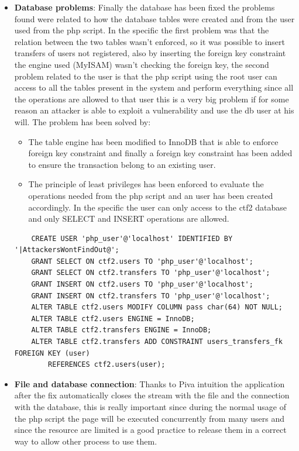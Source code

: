 \documentclass[14pt]{article}
\begin{document}
\begin{itemize}
	\item \textbf{Database problems}: Finally the database has been fixed the problems found were related to how the database tables were created and from the user used from the php script. In the specific the first problem was that the relation between the two tables wasn't enforced, so it was possible to insert transfers of users not registered, also by inserting the foreign key constraint the engine used (MyISAM) wasn't checking the foreign key, the second problem related to the user is that the php script using the root user can access to all the tables present in the system and perform everything since all the operations are allowed to that user this is a very big problem if for some reason an attacker is able to exploit a vulnerability and use the db user at his will.
	The problem has been solved by:
	\begin{itemize}
		\item The table engine has been modified to InnoDB that is able to enforce foreign key constraint and finally a foreign key constraint has been added to ensure the transaction belong to an existing user.
		
		\item The principle of least privileges has been enforced to evaluate the operations needed from the php script and an user has been created accordingly. In the specific the user can only access to the ctf2 database and only SELECT and INSERT operations are allowed.
	\end{itemize}
	\begin{Verbatim}
	CREATE USER 'php_user'@'localhost' IDENTIFIED BY '|AttackersWontFindOut@';
	GRANT SELECT ON ctf2.users TO 'php_user'@'localhost';
	GRANT SELECT ON ctf2.transfers TO 'php_user'@'localhost';
	GRANT INSERT ON ctf2.users TO 'php_user'@'localhost';
	GRANT INSERT ON ctf2.transfers TO 'php_user'@'localhost';
	ALTER TABLE ctf2.users MODIFY COLUMN pass char(64) NOT NULL;
	ALTER TABLE ctf2.users ENGINE = InnoDB;
	ALTER TABLE ctf2.transfers ENGINE = InnoDB;
	ALTER TABLE ctf2.transfers ADD CONSTRAINT users_transfers_fk FOREIGN KEY (user)
		REFERENCES ctf2.users(user);
	\end{Verbatim}
	
	\item \textbf{File and database connection}: Thanks to Piva intuition the application after the fix automatically closes the stream with the file and the connection with the database, this is really important since during the normal usage of the php script the page will be executed concurrently from many users and since the resource are limited is a good practice to release them in a correct way to allow other process to use them.
	

\end{itemize}
\end{document}
